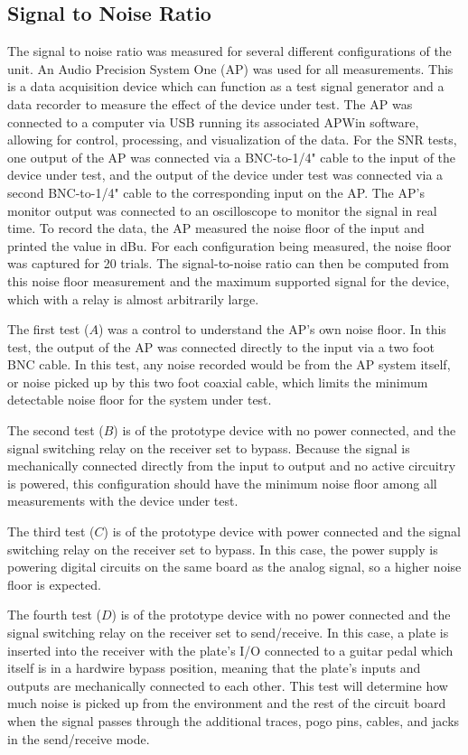 \documentclass{article}
\begin{document}
	\subsection{Signal to Noise Ratio}
	The signal to noise ratio was measured for several different configurations of the unit.  An Audio Precision System One (AP) was used for all measurements.  This is a data acquisition device which can function as a test signal generator and a data recorder to measure the effect of the device under test.  The AP was connected to a computer via USB running its associated APWin software, allowing for control, processing, and visualization of the data.  For the SNR tests, one output of the AP was connected via a BNC-to-1/4" cable to the input of the device under test, and the output of the device under test was connected via a second BNC-to-1/4" cable to the corresponding input on the AP.  The AP's monitor output was connected to an oscilloscope to monitor the signal in real time.  To record the data, the AP measured the noise floor of the input and printed the value in dBu.  For each configuration being measured, the noise floor was captured for 20 trials.  The signal-to-noise ratio can then be computed from this noise floor measurement and the maximum supported signal for the device, which with a relay is almost arbitrarily large.

	The first test ($A$) was a control to understand the AP's own noise floor.  In this test, the output of the AP was connected directly to the input via a two foot BNC cable.  In this test, any noise recorded would be from the AP system itself, or noise picked up by this two foot coaxial cable, which limits the minimum detectable noise floor for the system under test.

	The second test ($B$) is of the prototype device with no power connected, and the signal switching relay on the receiver set to bypass.  Because the signal is mechanically connected directly from the input to output and no active circuitry is powered, this configuration should have the minimum noise floor among all measurements with the device under test.

	The third test ($C$) is of the prototype device with power connected and the signal switching relay on the receiver set to bypass.  In this case, the power supply is powering digital circuits on the same board as the analog signal, so a higher noise floor is expected.

	The fourth test ($D$) is of the prototype device with no power connected and the signal switching relay on the receiver set to send/receive.  In this case, a plate is inserted into the receiver with the plate's I/O connected to a guitar pedal which itself is in a hardwire bypass position, meaning that the plate's inputs and outputs are mechanically connected to each other.  This test will determine how much noise is picked up from the environment and the rest of the circuit board when the signal passes through the additional traces, pogo pins, cables, and jacks in the send/receive mode.
\end{document}
